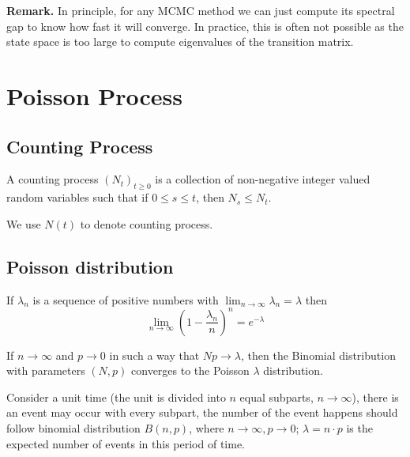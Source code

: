 \documentclass[11pt]{elegantbook}
\begin{document}
\textbf{Remark.} In principle, for any MCMC method we can just compute its spectral gap to know how fast it will converge. In practice, this is often not possible as the state space is too large to compute eigenvalues of the transition matrix.









\chapter{Poisson Process}
\section{Counting Process}
\begin{definition}
    A counting process $(N_t)_{t\geq0}$ is a collection of non-negative integer valued random variables such that if $0 \leq s \leq t$, then $N_s \leq N_t$.
\end{definition}
We use $N(t)$ to denote counting process.

\section{Poisson distribution}
\begin{lemma}
    If $\lambda_n$ is a sequence of positive numbers with $\lim_{n \rightarrow \infty}\lambda_n=\lambda$ then $$\lim_{n \rightarrow \infty}\left(1-\frac{\lambda_n}{n}\right)^n=e^{-\lambda}$$
\end{lemma}

\begin{theorem}
    If $n \rightarrow  \infty$ and $p \rightarrow 0$ in such a way that $Np \rightarrow \lambda$, then the Binomial distribution with parameters $(N,p)$ converges to the Poisson $\lambda$ distribution.
\end{theorem}
Consider a unit time (the unit is divided into $n$ equal subparts, $n \rightarrow \infty$), there is an event may occur with every subpart, the number of the event happens should follow binomial distribution $B(n,p)$, where $n \rightarrow \infty, p \rightarrow 0$; $\lambda=n\cdot p$ is the expected number of events in this period of time.
\end{document}

